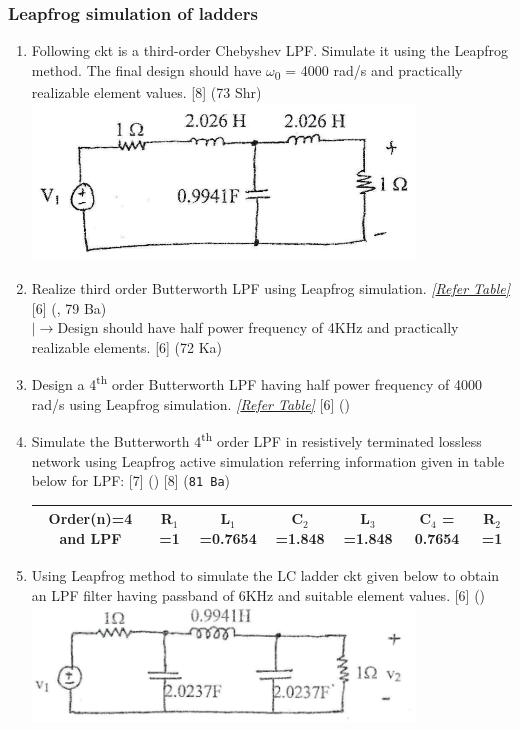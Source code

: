\documentclass[12pt]{article}
\newcommand{\w}{\(\omega\)}
\newcommand{\lb}{\\$\left|\rightarrow\right.$}
\newcommand{\sub}[1]{\textsubscript{#1}}
\newcommand{\super}[1]{\textsuperscript{#1}}
\begin{document}
		\subsubsection{Leapfrog simulation of ladders}
			\begin{enumerate}
				\item Following ckt is a third-order Chebyshev LPF. Simulate it using the Leapfrog method. The final design should have \w\sub{0} = 4000 rad/s and practically realizable element values. \hfill [8] (73 Shr)\\
				\includegraphics[width=4in]{./pics/fd_21}

				\item Realize third order Butterworth LPF using Leapfrog simulation. \textit{[\hyperref[sec:tables_81bh]{Refer Table]}} \hfill [6] (, 79 Ba)
				\lb Design should have half power frequency of 4KHz and practically realizable elements. \hfill [6] (72 Ka)

				\item Design a 4\super{th} order Butterworth LPF having half power frequency of 4000 rad/s using Leapfrog simulation. \textit{[\hyperref[sec:tables_81bh]{Refer Table]}} \hspace{12.3cm} [6] ()

				\item Simulate the Butterworth 4\super{th} order LPF in resistively terminated lossless network using Leapfrog active simulation referring information given in table below for LPF: \hfill [7] () [8] (\texttt{81 Ba})\\
				\begin{tabular}{|c|c|c|c|c|c|c|}
					\hline
					Order(n)=4 and LPF & R$_1$ =1 & L$_1$=0.7654 & C$_2$=1.848 & L$_3$=1.848 & C$_4$ = 0.7654 & R$_2$=1\\ \hline
				\end{tabular}

				\item Using Leapfrog method to simulate the LC ladder ckt given below to obtain an LPF filter having passband of 6KHz and suitable element values. \hfill [6] ()\\
				\includegraphics[width=4in]{./pics/fd_10}
			\end{enumerate}
\end{document}
